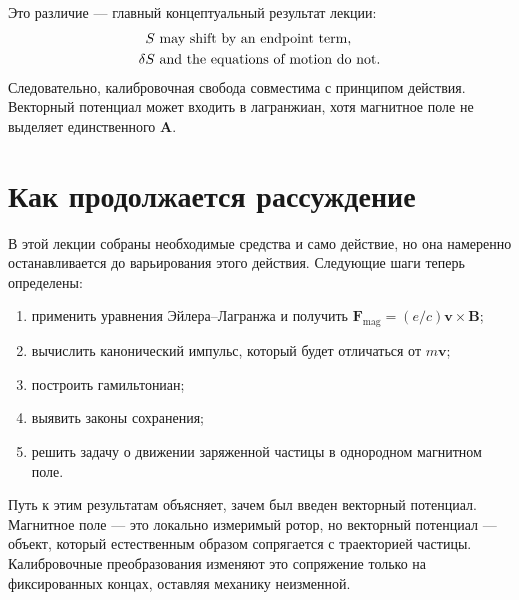 Это различие — главный концептуальный результат лекции:
\begin{equation}
  \begin{aligned}
    S&\ \hbox{may shift by an endpoint term},\\
    \delta S&\ \hbox{and the equations of motion do not}.
  \end{aligned}
\end{equation}
Следовательно, калибровочная свобода совместима с принципом действия. Векторный потенциал может входить в лагранжиан, хотя магнитное поле не выделяет единственного \(\mathbf A\).

\section{Как продолжается рассуждение}

В этой лекции собраны необходимые средства и само действие, но она намеренно останавливается до варьирования этого действия. Следующие шаги теперь определены:
\begin{enumerate}
  \item применить уравнения Эйлера--Лагранжа и получить
  \(\mathbf F_{\mathrm{mag}}=(e/c)\mathbf v\times\mathbf B\);
  \item вычислить канонический импульс, который будет отличаться от \(m\mathbf v\);
  \item построить гамильтониан;
  \item выявить законы сохранения;
  \item решить задачу о движении заряженной частицы в однородном магнитном поле.
\end{enumerate}

Путь к этим результатам объясняет, зачем был введен векторный потенциал. Магнитное поле — это локально измеримый ротор, но векторный потенциал — объект, который естественным образом сопрягается с траекторией частицы. Калибровочные преобразования изменяют это сопряжение только на фиксированных концах, оставляя механику неизменной.
